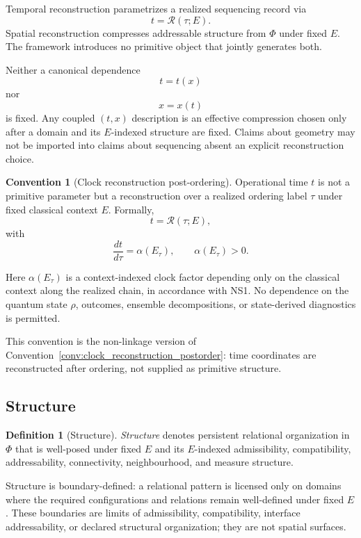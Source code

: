 \documentclass[aps,prx,onecolumn,11pt]{revtex4-2}
\theoremstyle{plain}
\theoremstyle{definition}
\newtheorem{definition}{Definition}
\newtheorem{convention}{Convention}
\theoremstyle{remark}
\begin{document}
Temporal reconstruction parametrizes a realized sequencing record via
\[
t=\mathcal R(\tau;E).
\]
Spatial reconstruction compresses addressable structure from \(\Phi\)
under fixed \(E\). The framework introduces no primitive object that
jointly generates both.

Neither a canonical dependence
\[
t=t(x)
\]
nor
\[
x=x(t)
\]
is fixed. Any coupled \((t,x)\) description is an effective compression
chosen only after a domain and its \(E\)-indexed structure are fixed.
Claims about geometry may not be imported into claims about sequencing
absent an explicit reconstruction choice.

\begin{convention}[Clock reconstruction post-ordering]
\label{conv:clock_reconstruction_postorder_nonlinkage}
Operational time \(t\) is not a primitive parameter but a reconstruction
over a realized ordering label \(\tau\) under fixed classical context
\(E\). Formally,
\begin{equation}
t=\mathcal R(\tau;E),
\end{equation}
with
\begin{equation}
\frac{dt}{d\tau}
=
\alpha(E_\tau),
\qquad
\alpha(E_\tau)>0.
\end{equation}

Here \(\alpha(E_\tau)\) is a context-indexed clock factor depending only
on the classical context along the realized chain, in accordance with
NS1. No dependence on the quantum state \(\rho\), outcomes, ensemble
decompositions, or state-derived diagnostics is permitted.
\end{convention}

This convention is the non-linkage version of
Convention~\ref{conv:clock_reconstruction_postorder}: time coordinates
are reconstructed after ordering, not supplied as primitive structure.

\subsection{Structure}
\label{subsec:structure}

\begin{definition}[Structure]
\label{def:structure_SSAF}
\emph{Structure} denotes persistent relational organization in \(\Phi\)
that is well-posed under fixed \(E\) and its \(E\)-indexed
admissibility, compatibility, addressability, connectivity,
neighbourhood, and measure structure.
\end{definition}

Structure is boundary-defined: a relational pattern is licensed only on
domains where the required configurations and relations remain
well-defined under fixed \(E\). These boundaries are limits of
admissibility, compatibility, interface addressability, or declared
structural organization; they are not spatial surfaces.
\end{document}
